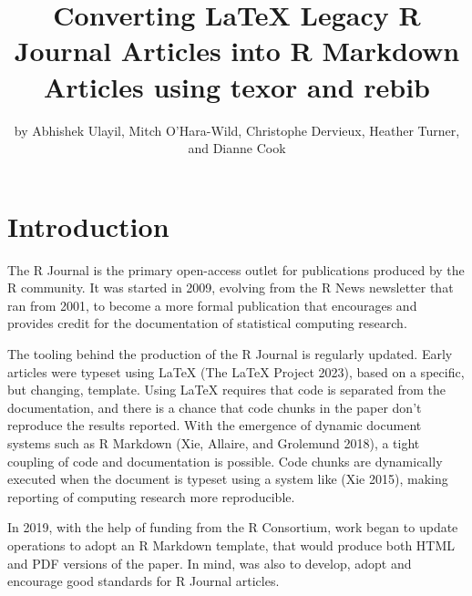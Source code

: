 \title{Converting LaTeX Legacy R Journal Articles into R Markdown Articles using texor and rebib}


\author{by Abhishek Ulayil, Mitch O'Hara-Wild, Christophe Dervieux, Heather Turner, and Dianne Cook}

\maketitle


\hypertarget{introduction}{%
\section{Introduction}\label{introduction}}

The R Journal is the primary open-access outlet for publications produced by the R community. It was started in 2009, evolving from the R News newsletter that ran from 2001, to become a more formal publication that encourages and provides credit for the documentation of statistical computing research.

The tooling behind the production of the R Journal is regularly updated. Early articles were typeset using LaTeX (The LaTeX Project 2023), based on a specific, but changing, template. Using LaTeX requires that code is separated from the documentation, and there is a chance that code chunks in the paper don't reproduce the results reported. With the emergence of dynamic document systems such as R Markdown (Xie, Allaire, and Grolemund 2018), a tight coupling of code and documentation is possible. Code chunks are dynamically executed when the document is typeset using a system like  (Xie 2015), making reporting of computing research more reproducible.

In 2019, with the help of funding from the R Consortium, work began to update operations to adopt an R Markdown template, that would produce both HTML and PDF versions of the paper. In mind, was also to develop, adopt and encourage good standards for R Journal articles.

